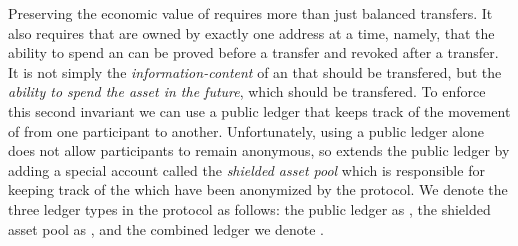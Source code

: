 Preserving the economic value of  requires more than just balanced transfers. It also requires that  are owned by exactly one address at a time, namely, that the ability to spend an \Asset{} can be proved before a transfer and revoked after a transfer. It is not simply the \emph{information-content} of an \Asset{} that should be transfered, but the \emph{ability to spend the asset in the future}, which should be transfered. To enforce this second invariant we can use a public ledger\footnotemark{} that keeps track of the movement of  from one participant to another. Unfortunately, using a public ledger alone does not allow participants to remain anonymous, so \MantaPay{} extends the public ledger by adding a special account called the \emph{shielded asset pool} which is responsible for keeping track of the  which have been anonymized by the protocol. We denote the three ledger types in the protocol as follows: the public ledger as \PublicLedger{}, the shielded asset pool as \ShieldedAssetPool{}, and the combined ledger we denote \Ledger{}.

\begin{center}
    \vspace{1em}
    \begin{mdframed}[leftmargin=0.2\textwidth, rightmargin=0.2\textwidth]
        \begin{center}
        \end{center}
    \end{mdframed}
    \vspace{-1em}
\end{center}

